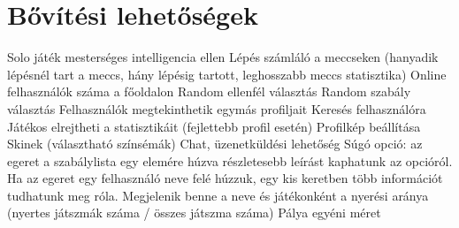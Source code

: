 \chapter{Bővítési lehetőségek}

Solo játék mesterséges intelligencia ellen
Lépés számláló a meccseken (hanyadik lépésnél tart a meccs, hány lépésig tartott, leghosszabb meccs statisztika)
Online felhasználók száma a főoldalon
Random ellenfél választás
Random szabály választás
Felhasználók megtekinthetik egymás profiljait
Keresés felhasználóra
Játékos elrejtheti a statisztikáit (fejlettebb profil esetén)
Profilkép beállítása
Skinek (választható színsémák)
Chat, üzenetküldési lehetőség
Súgó opció: az egeret a szabálylista egy elemére húzva részletesebb leírást kaphatunk az opcióról. Ha az egeret egy felhasználó neve felé húzzuk, egy kis keretben több információt tudhatunk meg róla. Megjelenik benne a neve és játékonként a nyerési aránya (nyertes játszmák száma / összes játszma száma)
Pálya egyéni méret
